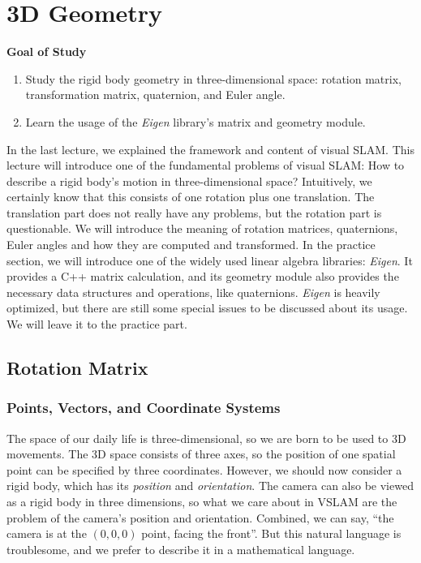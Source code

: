 \chapter{3D Geometry}
\label{cpt:3}

\begin{mdframed}
	\textbf{Goal of Study}
	\begin{enumerate}
		\item Study the rigid body geometry in three-dimensional space: rotation matrix, transformation matrix, quaternion, and Euler angle.
		\item Learn the usage of the \textit{Eigen} library's matrix and geometry module.
	\end{enumerate}
\end{mdframed}

In the last lecture, we explained the framework and content of visual SLAM. This lecture will introduce one of the fundamental problems of visual SLAM: How to describe a rigid body's motion in three-dimensional space? Intuitively, we certainly know that this consists of one rotation plus one translation. The translation part does not really have any problems, but the rotation part is questionable. We will introduce the meaning of rotation matrices, quaternions, Euler angles and how they are computed and transformed. In the practice section, we will introduce one of the widely used linear algebra libraries: \textit{Eigen}. It provides a C++ matrix calculation, and its geometry module also provides the necessary data structures and operations, like quaternions. \textit{Eigen} is heavily optimized, but there are still some special issues to be discussed about its usage. We will leave it to the practice part.

\newpage

\newpage

\section{Rotation Matrix}
\label{sec:3.1}
\subsection{Points, Vectors, and Coordinate Systems}
The space of our daily life is three-dimensional, so we are born to be used to 3D movements. The 3D space consists of three axes, so the position of one spatial point can be specified by three coordinates. However, we should now consider a rigid body, which has its \textit{position} and \textit{orientation}. The camera can also be viewed as a rigid body in three dimensions, so what we care about in VSLAM are the problem of the camera's position and orientation.  Combined, we can say, ``the camera is at the $( 0, 0, 0)$ point, facing the front''. But this natural language is troublesome, and we prefer to describe it in a mathematical language.

